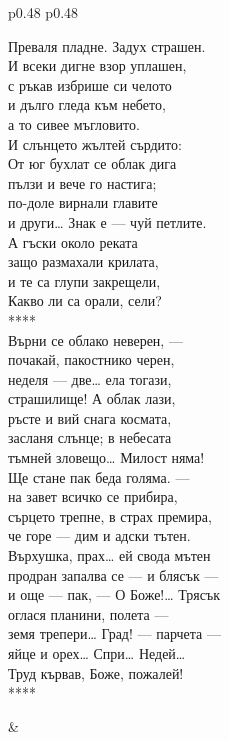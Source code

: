 \documentclass[12pt,a4paper]{article}
\begin{document}
\newpage
\begin{tabular}{p{0.48\textwidth} p{0.48\textwidth}}
\begin{minipage}[t]{\linewidth}
Преваля пладне. Задух страшен.\\
И всеки дигне взор уплашен,\\
с ръкав избрише си челото\\
и дълго гледа към небето,\\
а то сивее мъгловито.\\
И слънцето жълтей сърдито:\\
От юг бухлат се облак дига\\
пълзи и вече го настига;\\
по-доле вирнали главите\\
и други… Знак е — чуй петлите.\\
А гъски около реката\\
защо размахали крилата,\\
и те са глупи закрещели,\\
Какво ли са орали, сели?\\
****\\
Върни се облако неверен, —\\
почакай, пакостнико черен,\\
неделя — две… ела тогази,\\
страшилище! А облак лази,\\
ръсте и вий снага космата,\\
засланя слънце; в небесата\\
тъмней зловещо… Милост няма!\\
Ще стане пак беда голяма. —\\
на завет всичко се прибира,\\
сърцето трепне, в страх премира,\\
че горе — дим и адски тътен.\\
Върхушка, прах… ей свода мътен\\
продран запалва се — и блясък —\\
и още — пак, — О Боже!… Трясък\\
оглася планини, полета —\\
земя трепери… Град! — парчета —\\
яйце и орех… Спри… Недей…\\
Труд кървав, Боже, пожалей!\\
****\\
\end{minipage}
&
\begin{minipage}[t]{\linewidth}

\end{minipage}
\end{tabular}
\end{document}
